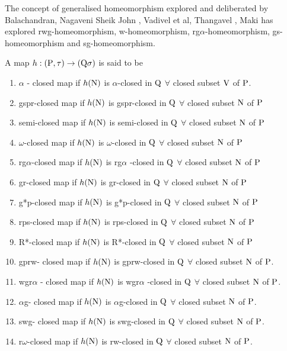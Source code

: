 The concept of generalised homeomorphism explored and deliberated by Balachandran, Nagaveni \cite{key25} Sheik John \cite{key30}, Vadivel et al, Thangavel \cite{key38}, Maki has explored rwg-homeomorphism, w-homeomorphism, rg$\alpha$-homeomorphism, gs-homeo\-mor\-phism and sg-homeomorphism.

\begin{dfn}\label{dfn1.4.1}
A map $h: (\mathrm{P}, \tau) \rightarrow (\mathrm{Q} \sigma)$ is said to be 
\begin{enumerate}
\item $\alpha$ - closed map \cite{key15} if $h(\mathrm{N})$ is $\alpha$-closed in $\mathrm{Q}$ $\forall$ closed subset $\mathrm{V}$ of $\mathrm{P}$. 
\item gspr-closed map \cite{key28} if $h(\mathrm{N})$ is gspr-closed in $\mathrm{Q}$ $\forall$ closed subset $\mathrm{N}$ of $\mathrm{P}$ 
\item semi-closed map \cite{key19} if $h(\mathrm{N})$ is semi-closed in $\mathrm{Q}$ $\forall$ closed subset $\mathrm{N}$ of $\mathrm{P}$ 
\item $\omega$-closed map \cite{key31} if $h(\mathrm{N})$ is $\omega$-closed in $\mathrm{Q}$ $\forall$ closed subset $\mathrm{N}$ of $\mathrm{P}$
\item rg$\alpha$-closed map \cite{key33} if $h(\mathrm{N})$ is rg$\alpha$ -closed in $\mathrm{Q}$ $\forall$ closed subset $\mathrm{N}$ of $\mathrm{P}$ 
\item gr-closed map \cite{key10} if $h(\mathrm{N})$ is gr-closed in $\mathrm{Q}$ $\forall$ closed subset $\mathrm{N}$ of $\mathrm{P}$ 
\item g*p-closed map \cite{key22} if $h(\mathrm{N})$ is g*p-closed in $\mathrm{Q}$ $\forall$ closed subset $\mathrm{N}$ of $\mathrm{P}$ 
\item rps-closed map \cite{key29} if $h(\mathrm{N})$ is rps-closed in $\mathrm{Q}$ $\forall$ closed subset $\mathrm{N}$ of $\mathrm{P}$ 
\item R*-closed map \cite{key14} if $h(\mathrm{N})$ is R*-closed in $\mathrm{Q}$ $\forall$ closed subset $\mathrm{N}$ of $\mathrm{P}$ 
\item gprw- closed map \cite{key17} if $h(\mathrm{N})$ is gprw-closed in $\mathrm{Q}$ $\forall$ closed subset $\mathrm{N}$ of $\mathrm{P}$. 
\item wgr$\alpha$ - closed map \cite{key16} if $h(\mathrm{N})$ is wgr$\alpha$ -closed in $\mathrm{Q}$ $\forall$ closed subset $\mathrm{N}$ of $\mathrm{P}$. 
\item $\alpha$g- closed map \cite{key21} if $h(\mathrm{N})$ is $\alpha$g-closed in $\mathrm{Q}$ $\forall$ closed subset $\mathrm{N}$ of $\mathrm{P}$. 
\item swg- closed map \cite{key26} if $h(\mathrm{N})$ is swg-closed in $\mathrm{Q}$ $\forall$ closed subset $\mathrm{N}$ of $\mathrm{P}$. 
\item r$\omega$-closed map \cite{key28} if $h(\mathrm{N})$ is rw-closed in $\mathrm{Q}$ $\forall$ closed subset $\mathrm{N}$ of $\mathrm{P}$. 

\end{enumerate}
\end{dfn}
